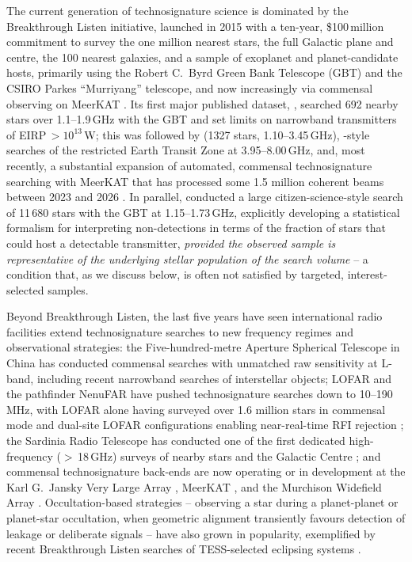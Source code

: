 \documentclass{openjournal}
\begin{document}
The current generation of technosignature science is dominated by the
Breakthrough Listen initiative, launched in 2015 with a ten-year, \$100\,million
commitment to survey the one million nearest stars, the full Galactic plane and
centre, the 100 nearest galaxies, and a sample of exoplanet and planet-candidate
hosts, primarily using the Robert C.\ Byrd Green Bank Telescope (GBT) and the
CSIRO Parkes ``Murriyang'' telescope, and now increasingly via commensal
observing on MeerKAT \citep{BLoverview}. Its first major published dataset,
\citet{Enriquez2017}, searched 692 nearby stars over 1.1--1.9\,GHz with the GBT
and set limits on narrowband transmitters of EIRP\,$>10^{13}$\,W; this was
followed by \citet{Price2020} (1327 stars, 1.10--3.45\,GHz),
\citet{Gajjar2019EarthTransitZone}-style searches of the restricted Earth Transit
Zone at 3.95--8.00\,GHz, and, most recently, a substantial expansion of automated,
commensal technosignature searching with MeerKAT that has processed some 1.5
million coherent beams between 2023 and 2026 \citep{BLMeerKAT2026}. In parallel,
\citet{Margot2023} conducted a large citizen-science-style search of 11\,680
stars with the GBT at 1.15--1.73\,GHz, explicitly developing a statistical
formalism for interpreting non-detections in terms of the fraction of stars that
could host a detectable transmitter, \emph{provided the observed sample is
representative of the underlying stellar population of the search volume} -- a
condition that, as we discuss below, is often not satisfied by targeted,
interest-selected samples.

Beyond Breakthrough Listen, the last five years have seen international radio
facilities extend technosignature searches to new frequency regimes and
observational strategies: the Five-hundred-metre Aperture Spherical Telescope
\citep[FAST;][]{Zhang2020, FAST3IATLAS2025} in China has conducted commensal
searches with unmatched raw sensitivity at L-band, including recent narrowband
searches of interstellar objects; LOFAR and the pathfinder NenuFAR have pushed
technosignature searches down to 10--190\,MHz, with LOFAR alone having surveyed
over 1.6 million stars in commensal mode and dual-site LOFAR configurations
enabling near-real-time RFI rejection \citep{LOFARdualsite2023}; the Sardinia
Radio Telescope has conducted one of the first dedicated high-frequency
($>$\,18\,GHz) surveys of nearby stars and the Galactic Centre
\citep{SRT2025}; and commensal technosignature back-ends are now operating or in
development at the Karl G.\ Jansky Very Large Array \citep[the COSMIC
system;][]{Tremblay2024}, MeerKAT \citep{Czech2021}, and the Murchison Widefield
Array \citep{Morrison2023}. Occultation-based strategies -- observing a star
during a planet-planet or planet-star occultation, when geometric alignment
transiently favours detection of leakage or deliberate signals -- have also grown
in popularity, exemplified by recent Breakthrough Listen searches of TESS-selected
eclipsing systems \citep{TESSeclipsing2025}.
\end{document}
